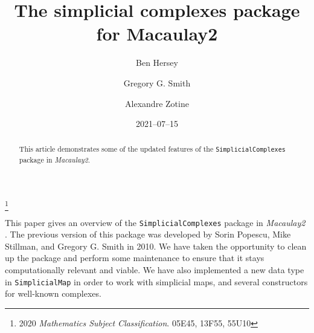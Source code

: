 \documentclass[12pt,leqno]{amsart}
\theoremstyle{definition}
\begin{document}
\title[Simplicial Complexes]{The simplicial complexes package for Macaulay2}
\author[B.~Hersey]{Ben Hersey}
\address{Ben Hersey: Department of Mathematics and Statistics, Queen's
  University, Kingston, Ontario, K7L 3N6;
  {\normalfont\texttt{b.hersey@queensu.ca}}}

\author[G.G.~Smith]{Gregory G.{} Smith}
\address{Gregory G.{} Smith: Department of Mathematics and Statistics, Queen's
  University, Kingston, Ontario, K7L 3N6, Canada;
  {\normalfont\texttt{ggsmith@mast.queensu.ca}}}

\author[A.~Zotine]{Alexandre Zotine}
\address{Alexandre Zotine: Department of Mathematics and Statistics, Queen's
  University, Kingston, Ontario, K7L 3N6;
  {\normalfont\texttt{18az45@queensu.ca}}}

\thanks{2020 \emph{Mathematics Subject Classification}. 05E45, 13F55,
  55U10%
}
\date{2021--07--15}

\begin{abstract}
  This article demonstrates some of the updated features of the
  \texttt{SimplicialComplexes} package in \emph{Macaulay2}.
\end{abstract}

\maketitle


\addtocounter{section}{0}
\addtocounter{lemma}{-1}

\noindent
This paper gives an overview of the \texttt{SimplicialComplexes} package in
\emph{Macaulay2} \cite{M2}. The previous version of this package was developed
by Sorin Popescu, Mike Stillman, and Gregory G. Smith in 2010. We have taken
the opportunity to clean up the package and perform some maintenance to ensure
that it stays computationally relevant and viable. We have also implemented a
new data type in \texttt{SimplicialMap} in order to work with simplicial maps,
and several constructors for well-known complexes.
\end{document}
